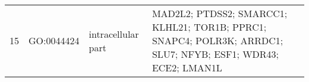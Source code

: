 \documentclass[10pt,letterpaper]{article}
\begin{document}
\begin{table}[!hp]
\begin{adjustwidth}{-.5in}{0in}
\begin{tabular}{|c|c|p{1.5in}|p{4in}|}
  15 & GO:0044424 & intracellular part & \footnotesize{MAD2L2; PTDSS2; SMARCC1; KLHL21; TOR1B; PPRC1; SNAPC4; POLR3K; ARRDC1; SLU7; NFYB; ESF1; WDR43; ECE2; LMAN1L} \\

\end{tabular}
\end{adjustwidth}
\end{table}
\end{document}
